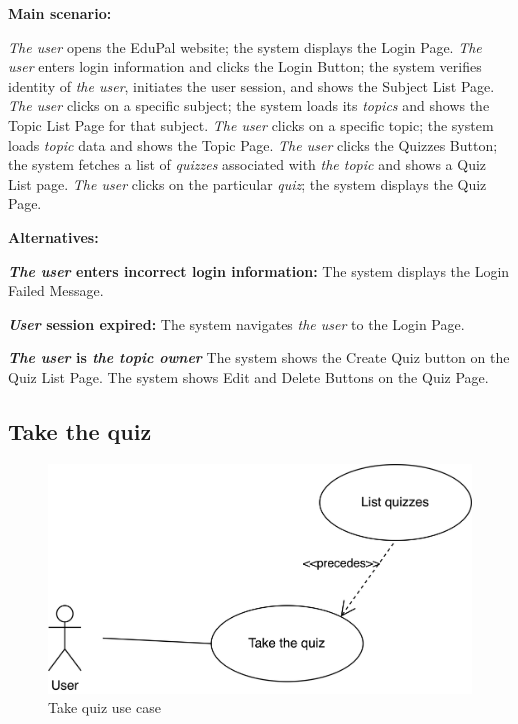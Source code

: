 \documentclass[
    english, %
]{VUMIFPSkursinis}
\begin{document}
\noindent\textbf{\fontsize{13}{15}\selectfont Main scenario:}

\textit{The user} opens the EduPal website; the system displays the Login Page. \textit{The user} enters login information and clicks the Login Button; the system verifies identity of \textit{the user}, initiates the user session, and shows the Subject List Page. \textit{The user} clicks on a specific subject; the system loads its \textit{topics} and shows the Topic List Page for that subject. \textit{The user} clicks on a specific topic; the system loads \textit{topic} data and shows the Topic Page. \textit{The user} clicks the Quizzes Button; the system fetches a list of \textit{quizzes} associated with \textit{the topic} and shows a Quiz List page. \textit{The user} clicks on the particular \textit{quiz}; the system displays the Quiz Page.

\noindent\textbf{\fontsize{13}{15}\selectfont Alternatives:}

\textbf{\textit{The user} enters incorrect login information:} The system displays the Login Failed Message.

\textbf{\textit{User} session expired:} The system navigates \textit{the user} to the Login Page.

\textbf{\textit{The user} is \textit{the topic owner}} The system shows the Create Quiz button on the Quiz List Page. The system shows Edit and Delete Buttons on the Quiz Page.

\pagebreak

\subsection{Take the quiz}

\begin{figure}[ht]
    \centering
    \includegraphics[width=\textwidth]{../lab3diags/take-quiz.drawio.png}
    \caption{Take quiz use case}
    \label{take-quiz}
\end{figure}
\end{document}
